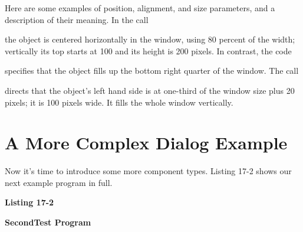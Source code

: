 Here are some examples of position, alignment, and size parameters, and
a description of their meaning. In the call


\noindent
the object is centered horizontally in the window, using 80
percent of the width; vertically its top starts at 100 and its
height is 200 pixels. In contrast, the code


\noindent
specifies that the object fills up the bottom right quarter of the
window. The call


\noindent
directs that the object's left hand side is at
one-third of the window size plus 20 pixels; it is 100 pixels wide. It
fills the whole window vertically.

\section{A More Complex Dialog Example}

Now it's time to introduce some more component types.
Listing 17-2 shows our next example program in full.

\bigskip

{\sffamily\bfseries
Listing 17-2}

{\sffamily\bfseries
SecondTest Program}


